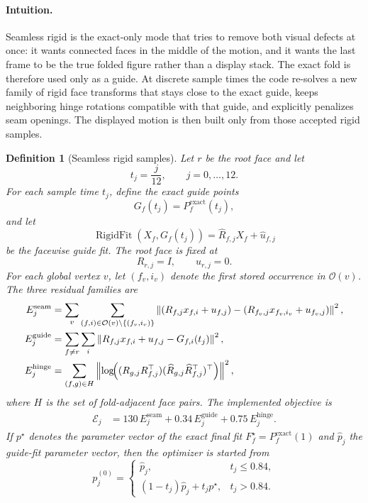 \documentclass[11pt]{article}
\newtheorem{definition}{Definition}[section]
\theoremstyle{remark}
\newcommand{\norm}[1]{\left\lVert #1 \right\rVert}
\newcommand{\set}[1]{\left\{ #1 \right\}}
\begin{document}
\paragraph{Intuition.}
Seamless rigid is the exact-only mode that tries to remove both visual defects
at once: it wants connected faces in the middle of the motion, and it wants the
last frame to be the true folded figure rather than a display stack. The exact
fold is therefore used only as a guide. At discrete sample times the code
re-solves a new family of rigid face transforms that stays close to the exact
guide, keeps neighboring hinge rotations compatible with that guide, and
explicitly penalizes seam openings. The displayed motion is then built only from
those accepted rigid samples.

\begin{definition}[Seamless rigid samples]
Let $r$ be the root face and let
\[
t_j=\frac{j}{12},
\qquad
j=0,\dots,12.
\]
For each sample time $t_j$, define the exact guide points
\[
G_f(t_j)=P_f^{\mathrm{exact}}(t_j),
\]
and let
\[
\operatorname{RigidFit}(X_f,G_f(t_j))
=
\widehat R_{f,j}X_f+\widehat u_{f,j}
\]
be the facewise guide fit. The root face is fixed at
\[
R_{r,j}=I,
\qquad
u_{r,j}=0.
\]
For each global vertex $v$, let $(f_v,i_v)$ denote the first stored occurrence
in $\mathcal O(v)$. The three residual families are
\begin{align}
E^{\mathrm{seam}}_j
&=
\sum_v
\sum_{(f,i)\in\mathcal O(v)\setminus\set{(f_v,i_v)}}
\norm{
(R_{f,j}x_{f,i}+u_{f,j})
-
(R_{f_v,j}x_{f_v,i_v}+u_{f_v,j})
}^2,
\notag\\
E^{\mathrm{guide}}_j
&=
\sum_{f\ne r}\sum_i
\norm{R_{f,j}x_{f,i}+u_{f,j}-G_{f,i}(t_j)}^2,
\notag\\
E^{\mathrm{hinge}}_j
&=
\sum_{(f,g)\in H}
\norm{
\log\!\Bigl(
(R_{g,j}R_{f,j}^{\top})
(\widehat R_{g,j}\widehat R_{f,j}^{\top})^{\top}
\Bigr)
}^2,
\notag
\end{align}
where $H$ is the set of fold-adjacent face pairs. The implemented objective is
\begin{align}
\mathcal E_j
&=
130\,E^{\mathrm{seam}}_j
+0.34\,E^{\mathrm{guide}}_j
+0.75\,E^{\mathrm{hinge}}_j.
\label{eq:seamless-rigid}
\end{align}
If $p^\star$ denotes the parameter vector of the exact final fit
$F_f^\star=P_f^{\mathrm{exact}}(1)$ and $\widehat p_j$ the guide-fit parameter
vector, then the optimizer is started from
\[
p_j^{(0)}
=
\begin{cases}
\widehat p_j,& t_j\le0.84,\\[2mm]
(1-t_j)\widehat p_j+t_jp^\star,& t_j>0.84.
\end{cases}
\]
\end{definition}
\end{document}
